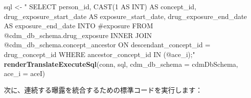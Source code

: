 \documentclass[
  11pt]{book}
\newenvironment{Shaded}{\begin{snugshade}}{\end{snugshade}}
\newcommand{\AttributeTok}[1]{\textcolor[rgb]{0.13,0.29,0.53}{#1}}
\newcommand{\FunctionTok}[1]{\textcolor[rgb]{0.13,0.29,0.53}{\textbf{#1}}}
\newcommand{\NormalTok}[1]{#1}
\newcommand{\OtherTok}[1]{\textcolor[rgb]{0.56,0.35,0.01}{#1}}
\newcommand{\StringTok}[1]{\textcolor[rgb]{0.31,0.60,0.02}{#1}}
\theoremstyle{definition}
\theoremstyle{definition}
\theoremstyle{definition}
\theoremstyle{definition}
\theoremstyle{remark}
\begin{document}
\begin{Shaded}
\begin{Highlighting}[]
\NormalTok{sql }\OtherTok{\textless{}{-}} \StringTok{"}
\StringTok{  SELECT person\_id,}
\StringTok{    CAST(1 AS INT) AS concept\_id,}
\StringTok{    drug\_exposure\_start\_date AS exposure\_start\_date,}
\StringTok{    drug\_exposure\_end\_date AS exposure\_end\_date}
\StringTok{  INTO \#exposure}
\StringTok{  FROM @cdm\_db\_schema.drug\_exposure}
\StringTok{  INNER JOIN @cdm\_db\_schema.concept\_ancestor}
\StringTok{    ON descendant\_concept\_id = drug\_concept\_id}
\StringTok{  WHERE ancestor\_concept\_id IN (@ace\_i);"}
\FunctionTok{renderTranslateExecuteSql}\NormalTok{(conn,}
\NormalTok{                          sql,}
                          \AttributeTok{cdm\_db\_schema =}\NormalTok{ cdmDbSchema,}
                          \AttributeTok{ace\_i =}\NormalTok{ aceI)}
\end{Highlighting}
\end{Shaded}

次に、連続する曝露を統合するための標準コードを実行します：
\end{document}
